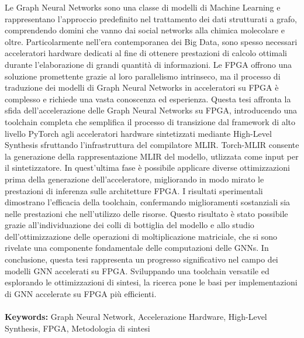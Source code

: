 Le Graph Neural Networks sono una classe di modelli di Machine Learning e rappresentano l'approccio predefinito nel trattamento dei dati strutturati a grafo, comprendendo domini che vanno dai social networks alla chimica molecolare e oltre.
Particolarmente nell'era contemporanea dei Big Data, sono spesso necessari acceleratori hardware dedicati al fine di ottenere prestazioni di calcolo ottimali durante l'elaborazione di grandi quantità di informazioni.
Le FPGA offrono una soluzione promettente grazie al loro parallelismo intrinseco, ma il processo di traduzione dei modelli di Graph Neural Networks in acceleratori su FPGA è complesso e richiede una vasta conoscenza ed esperienza.
Questa tesi affronta la sfida dell'accelerazione delle Graph Neural Networks su FPGA, introducendo una toolchain completa che semplifica il processo di transizione dal framework di alto livello PyTorch agli acceleratori hardware sintetizzati mediante High-Level Synthesis sfruttando l'infrastruttura del compilatore MLIR\@.
Torch-MLIR consente la generazione della rappresentazione MLIR del modello, utlizzata come input per il sintetizzatore.
In quest'ultima fase è possibile applicare diverse ottimizzazioni prima della generazione dell'acceleratore, migliorando in modo mirato le prestazioni di inferenza sulle architetture FPGA\@.
I risultati sperimentali dimostrano l'efficacia della toolchain, confermando miglioramenti sostanziali sia nelle prestazioni che nell'utilizzo delle risorse.
Questo risultato è stato possibile grazie all'individuazione dei colli di bottiglia del modello e allo studio dell'ottimizzazione delle operazioni di moltiplicazione matriciale, che si sono rivelate una componente fondamentale delle computazioni delle GNNs.
In conclusione, questa tesi rappresenta un progresso significativo nel campo dei modelli GNN accelerati su FPGA\@.
Sviluppando una toolchain versatile ed esplorando le ottimizzazioni di sintesi, la ricerca pone le basi per implementazioni di GNN accelerate su FPGA più efficienti.
\\
\\
\textbf{Keywords:} Graph Neural Network, Accelerazione Hardware, High-Level Synthesis, FPGA, Metodologia di sintesi %